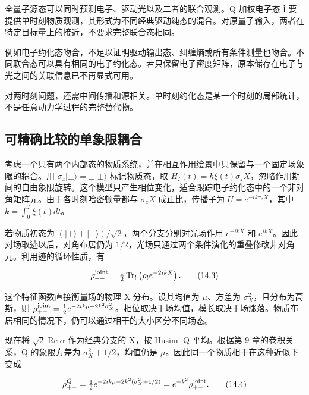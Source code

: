 \documentclass[UTF8,a4paper,zihao=-4,openany,fontset=fandol]{ctexbook}
\begin{document}
全量子源态可以同时预测电子、驱动光以及二者的联合观测。Q 加权电子态主要提供单时刻物质观测，其形式为不同经典驱动纯态的混合。对原量子输入，两者在特定目标量上的接近，不要求完整联合态相同。



例如电子约化态吻合，不足以证明驱动输出态、纠缠熵或所有条件测量也吻合。不同联合态可以具有相同的电子约化态。若只保留电子密度矩阵，原本储存在电子与光之间的关联信息已不再显式可用。



对两时刻问题，还需中间传播和源相关。单时刻约化态是某一个时刻的局部统计，不是任意动力学过程的完整替代物。



\subsection{可精确比较的单象限耦合}


考虑一个只有两个内部态的物质系统，并在相互作用绘景中只保留与一个固定场象限的耦合。用 $\sigma_z|\pm\rangle=\pm|\pm\rangle$ 标记物质态，取 $H_I(t)=\hbar\xi(t)\sigma_z X$，忽略作用期间的自由象限旋转。这个模型只产生相位变化，适合跟踪电子约化态中的一个非对角矩阵元。由于各时刻哈密顿量都与 $\sigma_z X$ 成正比，传播子为 $U=e^{-ik\sigma_z X}$，其中 $k=\int_0^T\xi(t)dt$。



若物质初态为 $(|+\rangle+|-\rangle)/\sqrt2$，两个分支分别对光场作用 $e^{-ikX}$ 和 $e^{ikX}$。因此对场取迹以后，对角布居仍为 $1/2$，光场只通过两个条件演化的重叠修改非对角元。利用迹的循环性质，有



\begin{equation*}
\rho_{+-}^{\rm joint}=\tfrac12\operatorname{Tr}_l
\left(\rho_l e^{-2ikX}\right).
\tag{14.3}\label{eq:14.3}
\end{equation*}


这个特征函数直接衡量场的物理 X 分布。设其均值为 $\mu$、方差为 $\sigma_X^2$，且分布为高斯，则 $\rho_{+-}^{\rm joint}=\tfrac12 e^{-2ik\mu-2k^2\sigma_X^2}$。相位取决于场均值，模长取决于场涨落。物质布居相同的情况下，仍可以通过相干的大小区分不同场态。



现在将 $\sqrt2\operatorname{Re}\alpha$ 作为经典分支的 X，按 Husimi Q 平均。根据第 9 章的卷积关系，Q 的象限方差为 $\sigma_X^2+1/2$，均值仍是 $\mu$。因此同一个物质相干在这种近似下变成



\begin{equation*}
\rho_{+-}^{Q}=\tfrac12 e^{-2ik\mu-2k^2(\sigma_X^2+1/2)}
=e^{-k^2}\rho_{+-}^{\rm joint}.
\tag{14.4}\label{eq:14.4}
\end{equation*}
\end{document}
